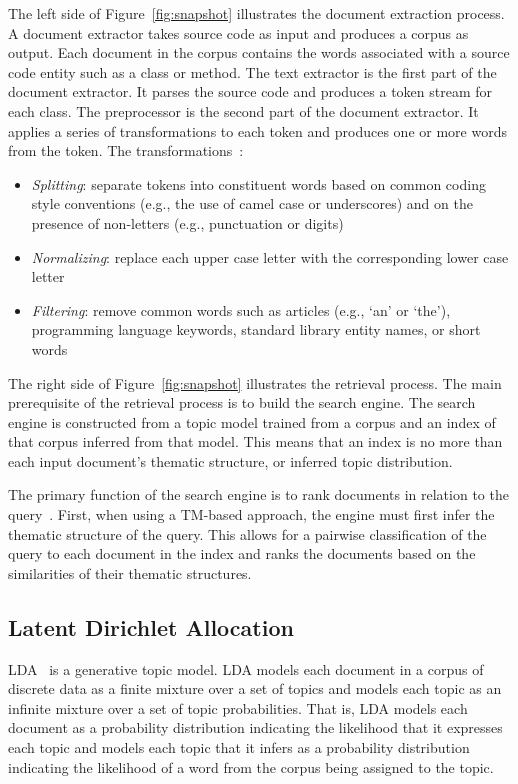 The left side of Figure~\ref{fig:snapshot} illustrates the document extraction
process.  A document extractor takes source code as input and produces a corpus
as output.  Each document in the corpus contains the words associated with
a source code entity such as a class or method.  The text extractor is the first
part of the document extractor.  It parses the source code and produces a token
stream for each class.  The preprocessor is the second part of the document
extractor.  It applies a series of transformations to each token and produces
one or more words from the token.
The transformations~\cite{Marcus-etal:2004,Marcus-Menzies:2010}: %
\begin{itemize}
    \item {\it Splitting}: separate tokens into constituent words based on
        common coding style conventions (e.g., the use of camel case or
        underscores) and on the presence of non-letters (e.g., punctuation or
        digits)
    \item {\it Normalizing}: replace each upper case letter with the
        corresponding lower case letter
    \item {\it Filtering}: remove common words such as articles (e.g., `an' or
        `the'), programming language keywords, standard library entity names, or
        short words
\end{itemize}

The right side of Figure~\ref{fig:snapshot} illustrates the retrieval process.
The main prerequisite of the retrieval process is to build the search engine.
The search engine is constructed from a topic model trained from a corpus and an
index of that corpus inferred from that model.
This means that an index is no more than each input document's thematic
structure, or inferred topic distribution.

The primary function of the search engine is to rank documents in relation to
the query~\cite{Croft-etal:2010}.  First, when using a TM-based approach, the
engine must first infer the thematic structure of the query.  This allows for
a pairwise classification of the query to each document in the index and ranks
the documents based on the similarities of their thematic structures.

\subsection{Latent Dirichlet Allocation}

LDA~\cite{Blei-etal:2003} is a generative topic model.
LDA models each document in a corpus of discrete data as a finite mixture over
a set of topics and models each topic as an infinite mixture over a set of
topic probabilities.  That is, LDA models each document as a probability
distribution indicating the likelihood that it expresses each topic and models
each topic that it infers as a probability distribution indicating the
likelihood of a word from the corpus being assigned to the topic.

